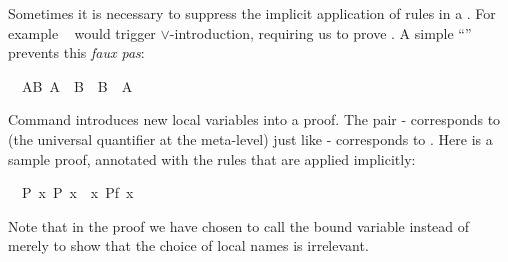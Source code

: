 \begin{isabellebody}
\begin{isamarkuptext}
Sometimes it is necessary to suppress the implicit application of rules in a
. For example ~ would
trigger $\lor$-introduction, requiring us to prove . A simple
``\isa{{\isacharminus}}'' prevents this \emph{faux pas}:%
\end{isamarkuptext}%
\isamarkuptrue%
\ \ AB{\isacharcolon}\ {\isachardoublequote}A\ {\isasymor}\ B{\isachardoublequote}\ \ {\isachardoublequote}B\ {\isasymor}\ A{\isachardoublequote}\isanewline
\isamarkupfalse%
\isamarkupfalse%
\isamarkupfalse%
\isamarkupfalse%
\isamarkupfalse%
\isamarkupfalse%
\isamarkupfalse%
\isamarkupfalse%
\isamarkupfalse%
\isamarkupfalse%
\isamarkupfalse%
\isamarkupfalse%
\isamarkupfalse%
\isamarkupfalse%
%
\isamarkuptrue%
%
\begin{isamarkuptext}%
Command  introduces new local variables into a
proof. The pair - corresponds to \isa{{\isasymAnd}}
(the universal quantifier at the
meta-level) just like - corresponds to
\isa{{\isasymLongrightarrow}}. Here is a sample proof, annotated with the rules that are
applied implicitly:%
\end{isamarkuptext}%
\isamarkuptrue%
\ \ P{\isacharcolon}\ {\isachardoublequote}{\isasymforall}x{\isachardot}\ P\ x{\isachardoublequote}\ \ {\isachardoublequote}{\isasymforall}x{\isachardot}\ P{\isacharparenleft}f\ x{\isacharparenright}{\isachardoublequote}\isanewline
\isamarkupfalse%
\isamarkupfalse%
\isamarkupfalse%
\isamarkupfalse%
\isamarkupfalse%
\isamarkupfalse%
\isamarkupfalse%
%
\begin{isamarkuptext}%
\noindent Note that in the proof we have chosen to call the bound
variable  instead of  merely to show that the choice of
local names is irrelevant.


\end{isamarkuptext}
\end{isabellebody}
